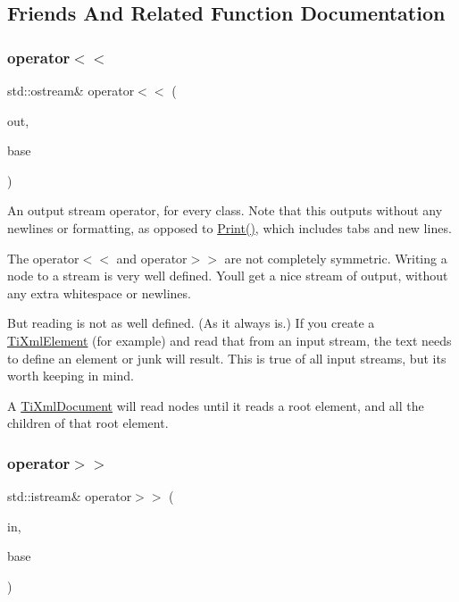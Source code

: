 \subsection{Friends And Related Function Documentation}
\mbox{\label{class_ti_xml_node_a86cd49cfb17a844c0010b3136ac966c7}} 
\subsubsection{\texorpdfstring{operator$<$$<$}{operator<<}}
{\footnotesize\ttfamily std\+::ostream\& operator$<$$<$ (\begin{DoxyParamCaption}\item[{std\+::ostream \&}]{out,  }\item[{const \hyperlink{class_ti_xml_node}{Ti\+Xml\+Node} \&}]{base }\end{DoxyParamCaption})\hspace{0.3cm}{\ttfamily [friend]}}

An output stream operator, for every class. Note that this outputs without any newlines or formatting, as opposed to \hyperlink{class_ti_xml_base_a0de56b3f2ef14c65091a3b916437b512}{Print()}, which includes tabs and new lines.

The operator$<$$<$ and operator$>$$>$ are not completely symmetric. Writing a node to a stream is very well defined. You\textquotesingle{}ll get a nice stream of output, without any extra whitespace or newlines.

But reading is not as well defined. (As it always is.) If you create a \hyperlink{class_ti_xml_element}{Ti\+Xml\+Element} (for example) and read that from an input stream, the text needs to define an element or junk will result. This is true of all input streams, but it\textquotesingle{}s worth keeping in mind.

A \hyperlink{class_ti_xml_document}{Ti\+Xml\+Document} will read nodes until it reads a root element, and all the children of that root element. \mbox{\label{class_ti_xml_node_ab57bd426563c926844f65a78412e18b9}} 
\subsubsection{\texorpdfstring{operator$>$$>$}{operator>>}}
{\footnotesize\ttfamily std\+::istream\& operator$>$$>$ (\begin{DoxyParamCaption}\item[{std\+::istream \&}]{in,  }\item[{\hyperlink{class_ti_xml_node}{Ti\+Xml\+Node} \&}]{base }\end{DoxyParamCaption})\hspace{0.3cm}{\ttfamily [friend]}}

